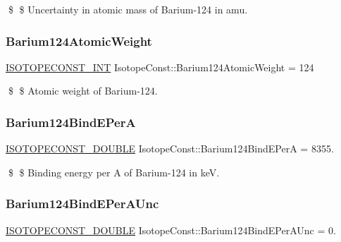 \$ \$ Uncertainty in atomic mass of Barium-\/124 in amu. \mbox{\label{group___isotope_const-_barium-_ba124_ga544b285dd0701f73f1437e92c6e81747}} 
\subsubsection{\texorpdfstring{Barium124\+Atomic\+Weight}{Barium124AtomicWeight}}
{\footnotesize\ttfamily \mbox{\hyperlink{group___isotope_const-_macros_ga5f18360b3e99483a35c32d789e62621c}{I\+S\+O\+T\+O\+P\+E\+C\+O\+N\+S\+T\+\_\+\+I\+NT}} Isotope\+Const\+::\+Barium124\+Atomic\+Weight = 124}

\$ \$ Atomic weight of Barium-\/124. \mbox{\label{group___isotope_const-_barium-_ba124_gacc0934855782ef17aa26ed0fbaa00672}} 
\subsubsection{\texorpdfstring{Barium124\+Bind\+E\+PerA}{Barium124BindEPerA}}
{\footnotesize\ttfamily \mbox{\hyperlink{group___isotope_const-_macros_ga8f45a7272ce02c0b4c65c44636ed719a}{I\+S\+O\+T\+O\+P\+E\+C\+O\+N\+S\+T\+\_\+\+D\+O\+U\+B\+LE}} Isotope\+Const\+::\+Barium124\+Bind\+E\+PerA = 8355.}

\$ \$ Binding energy per A of Barium-\/124 in keV. \mbox{\label{group___isotope_const-_barium-_ba124_gaea915e8dc0076c16bc2ad5599bc9979f}} 
\subsubsection{\texorpdfstring{Barium124\+Bind\+E\+Per\+A\+Unc}{Barium124BindEPerAUnc}}
{\footnotesize\ttfamily \mbox{\hyperlink{group___isotope_const-_macros_ga8f45a7272ce02c0b4c65c44636ed719a}{I\+S\+O\+T\+O\+P\+E\+C\+O\+N\+S\+T\+\_\+\+D\+O\+U\+B\+LE}} Isotope\+Const\+::\+Barium124\+Bind\+E\+Per\+A\+Unc = 0.}

